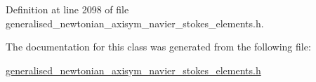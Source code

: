 Definition at line 2098 of file generalised\+\_\+newtonian\+\_\+axisym\+\_\+navier\+\_\+stokes\+\_\+elements.\+h.



The documentation for this class was generated from the following file\+:\begin{DoxyCompactItemize}
\item 
\hyperlink{generalised__newtonian__axisym__navier__stokes__elements_8h}{generalised\+\_\+newtonian\+\_\+axisym\+\_\+navier\+\_\+stokes\+\_\+elements.\+h}\end{DoxyCompactItemize}
